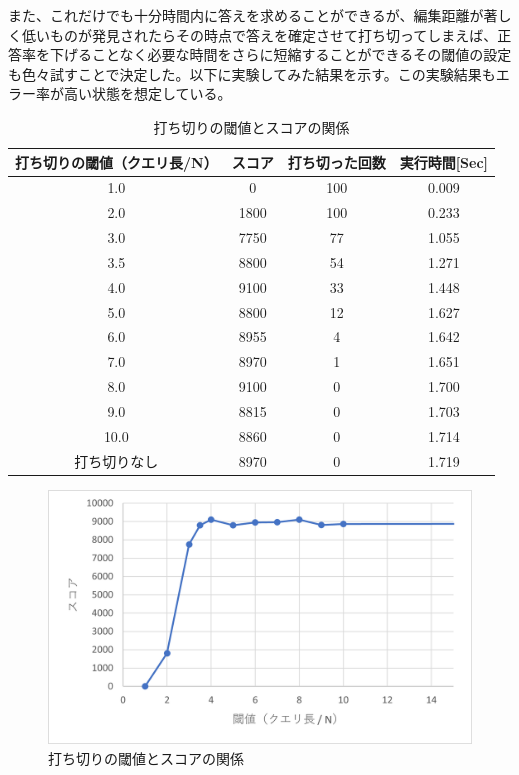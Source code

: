 \documentclass[dvipdfmx]{jsarticle}
\begin{document}
また、これだけでも十分時間内に答えを求めることができるが、編集距離が著しく低いものが発見されたらその時点で答えを確定させて打ち切ってしまえば、正答率を下げることなく必要な時間をさらに短縮することができるその閾値の設定も色々試すことで決定した。以下に実験してみた結果を示す。この実験結果もエラー率が高い状態を想定している。

\begin{table}[H]
  \centering
  \begin{tabular}{c|c|c|c}
    打ち切りの閾値（クエリ長/N） & スコア & 打ち切った回数 & 実行時間[Sec] \\ \hline\hline
    1.0 & 0 & 100 & 0.009 \\ \hline
    2.0 & 1800 & 100 & 0.233 \\ \hline
    3.0 & 7750 & 77 & 1.055 \\ \hline
    3.5 & 8800 & 54 & 1.271 \\ \hline
    4.0 & 9100 & 33 & 1.448 \\ \hline
    5.0 & 8800 & 12 & 1.627 \\ \hline
    6.0 & 8955 & 4 & 1.642 \\ \hline
    7.0 & 8970 & 1 & 1.651 \\ \hline
    8.0 & 9100 & 0 & 1.700 \\ \hline
    9.0 & 8815 & 0 & 1.703 \\ \hline
    10.0 & 8860 & 0 & 1.714 \\ \hline
    打ち切りなし & 8970 & 0 & 1.719 \\ \hline
  \end{tabular}
  \caption{打ち切りの閾値とスコアの関係}
\end{table}

\begin{figure}[H]
  \centering
  \includegraphics[scale = 1.0]{filter.png}
  \caption{打ち切りの閾値とスコアの関係}
\end{figure}
\end{document}
